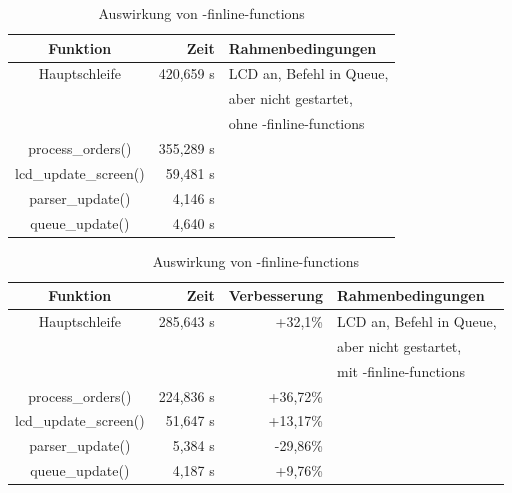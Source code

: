 \begin{table}[htb]
\begin{center}
	\begin{tabularx}{\textwidth}{|c||r|X|}
		\hline
		\textbf{Funktion} & \textbf{Zeit} & \textbf{Rahmenbedingungen} \\ \hline \hline
		Hauptschleife & 420,659 \textmu{}s & LCD an, Befehl in Queue,\\
		& & aber nicht gestartet, \\
		& & ohne -finline-functions \\ \hline
		process\_orders() & 355,289 \textmu{}s &  \\ \hline
		lcd\_update\_screen() & 59,481 \textmu{}s & \\ \hline
		parser\_update() & 4,146 \textmu{}s & \\ \hline
		queue\_update() & 4,640 \textmu{}s & \\ \hline \hline
	\end{tabularx}
	\begin{tabularx}{\textwidth}{|c||r|r|X|}
		\hline
		\textbf{Funktion} & \textbf{Zeit} & \textbf{Verbesserung} & \textbf{Rahmenbedingungen} \\ \hline \hline
		Hauptschleife & 285,643 \textmu{}s & +32,1\% & LCD an, Befehl in Queue,\\
		& & & aber nicht gestartet, \\
		& & & mit -finline-functions \\ \hline
		process\_orders() & 224,836 \textmu{}s & +36,72\% & \\ \hline
		lcd\_update\_screen() & 51,647 \textmu{}s & +13,17\% & \\ \hline
		parser\_update() & 5,384 \textmu{}s & -29,86\% & \\ \hline
		queue\_update() & 4,187 \textmu{}s & +9,76\% & \\ \hline
	\end{tabularx}
	\caption{\label{compiler_flags_2} Auswirkung von -finline-functions}
\end{center}
\end{table}
